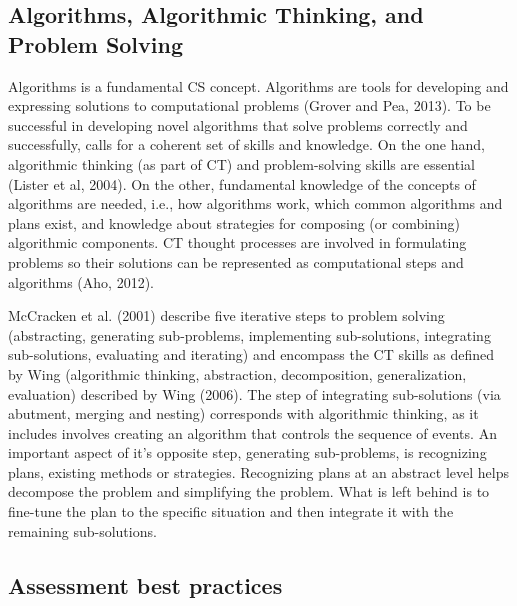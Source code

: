 \subsection{Algorithms, Algorithmic Thinking, and Problem Solving}

Algorithms is a fundamental CS concept. Algorithms are tools for developing and expressing solutions to computational problems (Grover and Pea, 2013). To be successful in developing novel algorithms that solve problems correctly and successfully, calls for a coherent set of skills and knowledge.
On the one hand, algorithmic thinking (as part of CT) and problem-solving skills are essential (Lister et al, 2004). On the other, fundamental knowledge of the concepts of algorithms are needed, i.e., how algorithms work, which common algorithms and plans exist, and knowledge about strategies for composing (or combining) algorithmic components. CT thought processes are involved in formulating problems so their solutions can be represented as computational steps and algorithms (Aho, 2012). 





McCracken et al. (2001) describe five iterative steps to problem solving (abstracting, generating sub-problems, implementing sub-solutions, integrating sub-solutions, evaluating and iterating) and encompass the CT skills as defined by Wing (algorithmic thinking, abstraction, decomposition, generalization, evaluation) described by Wing (2006). The step of integrating sub-solutions (via abutment, merging and nesting) corresponds with algorithmic thinking, as it includes involves creating an algorithm that controls the sequence of events. An important aspect of it's opposite step, generating sub-problems, is recognizing plans, existing methods or strategies. Recognizing plans at an abstract level helps decompose the problem and simplifying the problem. What is left behind is to fine-tune the plan to the specific situation and then integrate it with the remaining sub-solutions.


\subsection{Assessment best practices}


